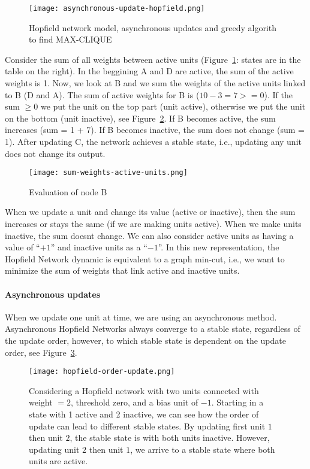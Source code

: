 \documentclass[main]{subfiles}
\begin{document}
\begin{figure}[H]
	\centering
	\texttt{[image: asynchronous-update-hopfield.png]}
	\caption{Hopfield network model, asynchronous updates and greedy algorith to find MAX-CLIQUE}
	\label{fig:asynchronous-update}
\end{figure}

Consider the sum of all weights between active units (Figure~\ref{fig:asynchronous-update}: states are in the table on the right). In the beggining A and D are active, the sum of the active weights is 1.
Now, we look at B and we sum the weights of the active units linked to B (D and A).
The sum of active weights for B is ($10 - 3 = 7 >= 0$).
If the sum $\geq 0$ we put the unit on the top part (unit active), otherwise we put the unit on the bottom (unit inactive), see Figure~\ref{fig:sum-weights}.
If B becomes active, the sum increases (sum = 1 + 7).
If B becomes inactive, the sum does not change (sum = 1).
After updating C, the network achieves a stable state, i.e., updating any unit does not change its output.

\begin{figure}[H]
	\centering
	\texttt{[image: sum-weights-active-units.png]}
	\caption{Evaluation of node B}
	\label{fig:sum-weights}
\end{figure}

When we update a unit and change its value (active or inactive), then the sum increases or stays the same (if we are making units active). When we make units inactive, the sum doesnt change.
We can also consider active units as having a value of ``$+1$'' and inactive units as a ``$-1$''.
In this new representation, the Hopfield Network dynamic is equivalent to a graph min-cut, i.e., we want to minimize the sum of weights that link active and inactive units.

\paragraph{Asynchronous updates}
When we update one unit at time, we are using an asynchronous method.
Asynchronous Hopfield Networks always converge to a stable state, regardless of the update order, however, to which stable state is dependent on the update order, see Figure~\ref{fig:hopfield-order-update}.

\begin{figure}[H]
	\centering
	\texttt{[image: hopfield-order-update.png]}
	\caption{Considering a Hopfield network with two units connected with weight $= 2$, threshold zero, and a bias unit of $-1$. Starting in a state with 1 active and 2 inactive, we can see how the order of update can lead to different stable states.
	By updating first unit $1$ then unit $2$, the stable state is with both units inactive. However, updating unit $2$ then unit $1$, we arrive to a stable state where both units are active.}
	\label{fig:hopfield-order-update}
\end{figure}
\end{document}
